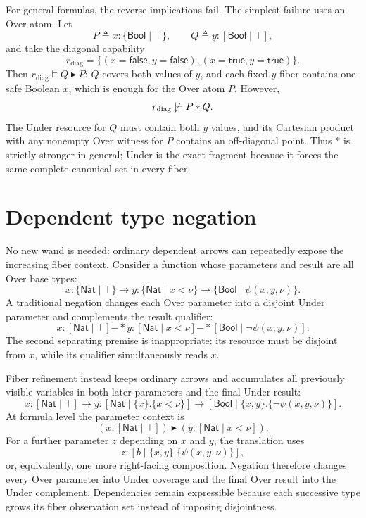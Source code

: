 \documentclass[10pt]{ctexart}
\newcommand{\Bool}{\mathsf{Bool}}
\newcommand{\false}{\mathsf{false}}
\newcommand{\true}{\mathsf{true}}
\newcommand{\rfcomp}{\mathbin{\blacktriangleright}}
\newcommand{\modelsr}{\mathrel{\models}}
\begin{document}
For general formulas, the reverse implications fail.  The simplest failure
uses an Over atom.  Let
\[
  P\triangleq x:\{\Bool\mid\top\},
  \qquad
  Q\triangleq y:[\Bool\mid\top],
\]
and take the diagonal capability
\[
  r_{\mathrm{diag}}
  =\{(x=\false,y=\false),(x=\true,y=\true)\}.
\]
Then $r_{\mathrm{diag}}\modelsr Q\rfcomp P$: $Q$ covers both values of $y$,
and each fixed-$y$ fiber contains one safe Boolean $x$, which is enough for
the Over atom $P$.  However,
\[
  r_{\mathrm{diag}}\not\modelsr P*Q.
\]
The Under resource for $Q$ must contain both $y$ values, and its Cartesian
product with any nonempty Over witness for $P$ contains an off-diagonal point.
Thus $*$ is strictly stronger in general; Under is the exact fragment because
it forces the same complete canonical set in every fiber.

\section{Dependent type negation}

No new wand is needed: ordinary dependent arrows can repeatedly expose the
increasing fiber context.  Consider a function whose parameters and result
are all Over base types:
\begin{equation}\label{eq:safety-example}
  x:\{\mathsf{Nat}\mid\top\}\to
  y:\{\mathsf{Nat}\mid x<\nu\}\to
  \{\Bool\mid\psi(x,y,\nu)\}.
\end{equation}
A traditional negation changes each Over parameter into a disjoint Under
parameter and complements the result qualifier:
\begin{equation}\label{eq:old-negation}
  x:[\mathsf{Nat}\mid\top]\mathbin{-*}
  y:[\mathsf{Nat}\mid x<\nu]\mathbin{-*}
  [\Bool\mid\neg\psi(x,y,\nu)].
\end{equation}
The second separating premise is inappropriate: its resource must be
disjoint from $x$, while its qualifier simultaneously reads $x$.

Fiber refinement instead keeps ordinary arrows and accumulates all previously
visible variables in both later parameters and the final Under result:
\begin{equation}\label{eq:new-negation}
  x:[\mathsf{Nat}\mid\top]\to
  y:[\mathsf{Nat}\mid\{x\}.\{x<\nu\}]\to
  [\Bool\mid\{x,y\}.\{\neg\psi(x,y,\nu)\}].
\end{equation}
At formula level the parameter context is
\[
  (x:[\mathsf{Nat}\mid\top])
  \rfcomp
  (y:[\mathsf{Nat}\mid x<\nu]).
\]
For a further parameter $z$ depending on $x$ and $y$, the translation uses
\[
  z:[b\mid\{x,y\}.\{\psi(x,y,\nu)\}],
\]
or, equivalently, one more right-facing composition.  Negation therefore
changes every Over parameter into Under coverage and the final Over result
into the Under complement.  Dependencies remain expressible because each
successive type grows its fiber observation set instead of imposing
disjointness.
\end{document}
